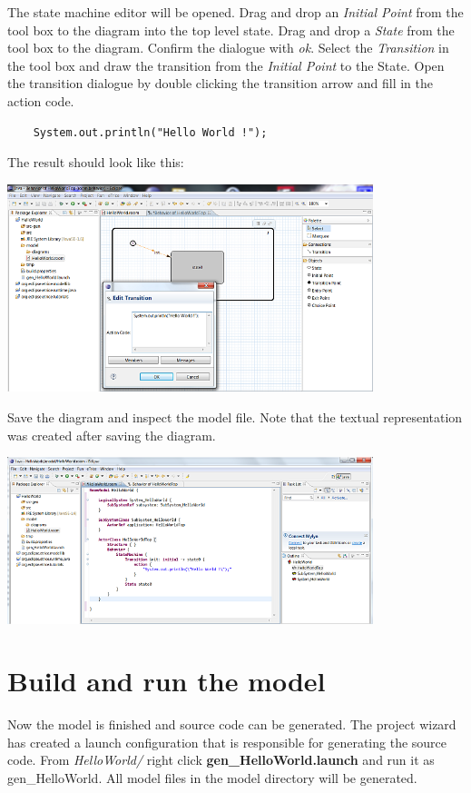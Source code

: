 The state machine editor will be opened. Drag and drop an \textit{Initial Point} from the tool box to the diagram into the top level state. Drag and drop a \textit{State} from the tool box to the diagram. Confirm the dialogue with \textit{ok}. Select the \textit{Transition} in the tool box and draw the transition from the \textit{Initial Point} to the State. Open the transition dialogue by double clicking the transition arrow and fill in the action code.

\begin{verbatim}
	System.out.println("Hello World !");
\end{verbatim}
 
The result should look like this:

\includegraphics[width=0.8\textwidth]{images/015-HelloWorld04.png}

Save the diagram and inspect the model file. Note that the textual representation was created after saving the diagram.

\includegraphics[width=0.8\textwidth]{images/015-HelloWorld05.png}


\section{Build and run the model}

Now the model is finished and source code can be generated. The project wizard has created a launch configuration that is responsible for generating the source code. From \textit{HelloWorld/} right click \textbf{gen\_HelloWorld.launch} and run it as gen\_HelloWorld. All model files in the model directory will be generated.


